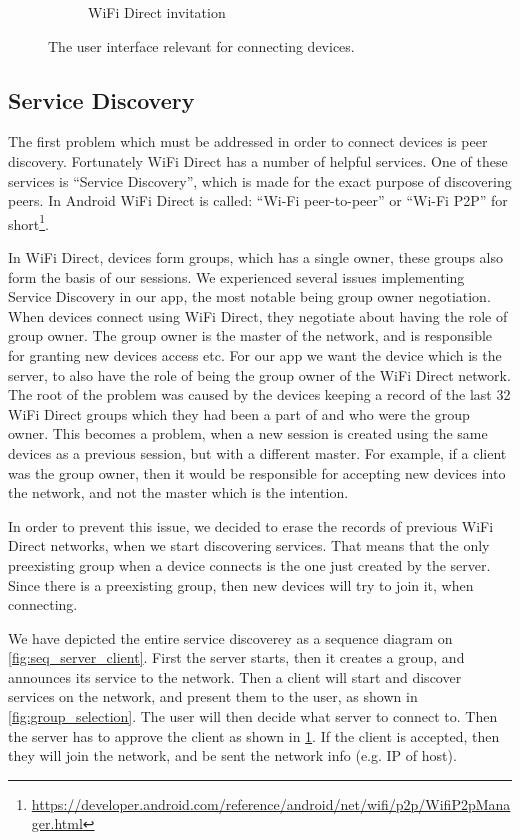 \begin{figure}[ht]
\begin{subfigure}[b]{0.33\linewidth}
    \caption{WiFi Direct invitation}
    \label{fig:wifidirectinv}
    \vspace{4ex}
  \end{subfigure}
  \caption{The user interface relevant for connecting devices.}
  \label{fig:connecting}
\end{figure}

\subsection{Service Discovery}

The first problem which must be addressed in order to connect devices is peer discovery.
Fortunately WiFi Direct has a number of helpful services.
One of these services is ``Service Discovery'', which is made for the exact purpose of discovering peers.
In Android WiFi Direct is called: ``Wi-Fi peer-to-peer'' or ``Wi-Fi P2P'' for short\footnote{\url{https://developer.android.com/reference/android/net/wifi/p2p/WifiP2pManager.html}}.

In WiFi Direct, devices form groups, which has a single owner, these groups also form the basis of our sessions.
We experienced several issues implementing Service Discovery in our app, the most notable being group owner negotiation.
When devices connect using WiFi Direct, they negotiate about having the role of group owner.
The group owner is the master of the network, and is responsible for granting new devices access etc.
For our app we want the device which is the server, to also have the role of being the group owner of the WiFi Direct network.
The root of the problem was caused by the devices keeping a record of the last 32 WiFi Direct groups which they had been a part of and who were the group owner.
This becomes a problem, when a new session is created using the same devices as a previous session, but with a different master.
For example, if a client was the group owner, then it would be responsible for accepting new devices into the network, and not the master which is the intention.

In order to prevent this issue, we decided to erase the records of previous WiFi Direct networks, when we start discovering services.
That means that the only preexisting group when a device connects is the one just created by the server.
Since there is a preexisting group, then new devices will try to join it, when connecting.

We have depicted the entire service discoverey as a sequence diagram on \cref{fig:seq_server_client}.
First the server starts, then it creates a group, and announces its service to the network.
Then a client will start and discover services on the network, and present them to the user, as shown in \cref{fig:group_selection}.
The user will then decide what server to connect to.
Then the server has to approve the client as shown in \cref{fig:wifidirectinv}.
If the client is accepted, then they will join the network, and be sent the network info (e.g. IP of host).

